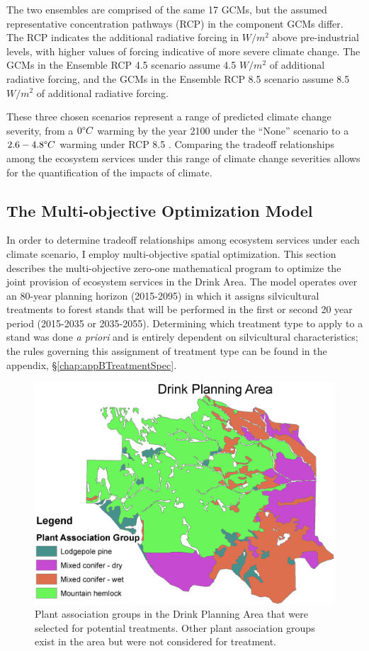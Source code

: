 The two ensembles are comprised of the same 17 GCMs, but the assumed representative concentration pathways (RCP) in the component GCMs differ. The RCP indicates the additional radiative forcing in $W/m^2$ above pre-industrial levels, with higher values of forcing indicative of more severe climate change. The GCMs in the Ensemble RCP 4.5 scenario assume 4.5 $W/m^2$ of additional radiative forcing, and the GCMs in the Ensemble RCP 8.5 scenario assume 8.5 $W/m^2$ of additional radiative forcing.

These three chosen scenarios represent a range of predicted climate change severity, from a $0 \degree C$ warming by the year 2100 under the ``None'' scenario to a $2.6-4.8 \degree C$ warming under RCP 8.5 \cite{ipcc2013climate}. Comparing the tradeoff relationships among the ecosystem services under this range of climate change severities allows for the quantification of the impacts of climate.

\subsection{The Multi-objective Optimization Model}
\label{sec:model}
In order to determine tradeoff relationships among ecosystem services under each climate scenario, I employ multi-objective spatial optimization. This section describes the multi-objective zero-one mathematical program to optimize the joint provision of ecosystem services in the Drink Area. The model operates over an 80-year planning horizon (2015-2095) in which it assigns silvicultural treatments to forest stands that will be performed in the first or second 20 year period (2015-2035 or 2035-2055). Determining which treatment type to apply to a stand was done \textit{a priori} and is entirely dependent on silvicultural characteristics; the rules governing this assignment of treatment type can be found in the appendix, \S \ref{chap:appBTreatmentSpec}.

\begin{figure}
\centering
\includegraphics[width=.5\textwidth]{../images/DrinkMap_PAGs}
\caption[Plant association groups in the Drink Planning Area]{Plant association groups in the Drink Planning Area that were selected for potential treatments. Other plant association groups exist in the area but were not considered for treatment.}
\label{fig:drinkPAGs}
\end{figure}

